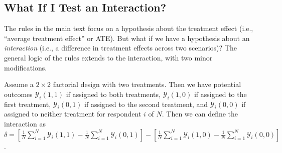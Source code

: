 \documentclass[12pt]{article}
\begin{document}
\subsection*{What If I Test an Interaction?}

The rules in the main text focus on a hypothesis about the treatment effect (i.e., ``average treatment effect'' or ATE).
But what if we have a hypothesis about an \emph{interaction} (i.e., a difference in treatment effects across two scenarios)?
The general logic of the rules extends to the interaction, with two minor modifications.

Assume a $2 \times 2$ factorial design with two treatments.
Then we have potential outcomes $\mathcal{Y}_{i}(1,1)$ if assigned to both treatments, $\mathcal{Y}_{i}(1,0)$ if assigned to the first treatment, $\mathcal{Y}_{i}(0,1)$ if assigned to the second treatment, and $\mathcal{Y}_{i}(0,0)$ if assigned to neither treatment for respondent $i$ of $N$.
Then we can define the interaction as $\delta = \left\lbrack \frac{1}{N}\sum_{i = 1}^{N}{\mathcal{Y}_{i}(1,1)} - \frac{1}{N}\sum_{i = 1}^{N}{\mathcal{Y}_{i}(0,1)} \right\rbrack - \left\lbrack \frac{1}{N}\sum_{i = 1}^{N}{\mathcal{Y}_{i}(1,0)}- \frac{1}{N}\sum_{i = 1}^{N}{\mathcal{Y}_{i}(0,0)} \right\rbrack$.
\end{document}
